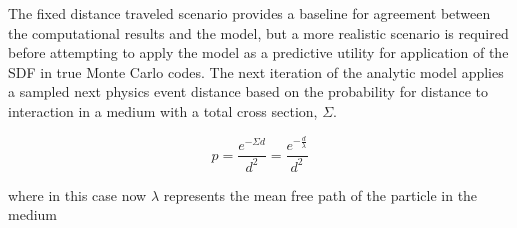 


The fixed distance traveled scenario provides a baseline for agreement between
the computational results and the model, but a more realistic scenario is
required before attempting to apply the model as a predictive utility for
application of the SDF in true Monte Carlo codes. The next iteration of the
analytic model applies a sampled next physics event distance based on the
probability for distance to interaction in a medium with a total cross section,
$\Sigma$.

\begin{equation}
  p = \frac{e^{-\Sigma d}}{d^{2}} = \frac{e^{-\frac{d}{\lambda}}}{d^{2}}
\end{equation}

where in this case now $\lambda$ represents the mean free path of the particle in the medium

